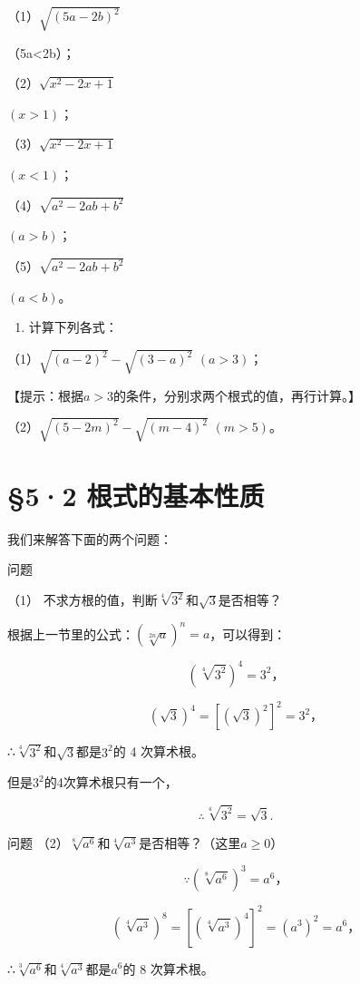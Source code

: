 （1）\(\sqrt{(5a - 2b)^2}\)

（5a\textless2b）；

（2）\(\sqrt{x^2 - 2x + 1}\)

\((x > 1)\)；

（3）\(\sqrt{x^2 - 2x + 1}\)

\((x < 1)\)；

（4）\(\sqrt{a^2 - 2ab + b^2}\)

\((a > b)\)；

（5）\(\sqrt{a^2 - 2ab + b^2}\)

\((a < b)\)。

\begin{enumerate}[start=8]
\item
  计算下列各式：
\end{enumerate}

（1）\(\sqrt{(a - 2)^2} - \sqrt{(3 - a)^2}\) \((a > 3)\)；

【提示：根据\(a > 3\)的条件，分别求两个根式的值，再行计算。】

（2）\(\sqrt{(5 - 2m)^2} - \sqrt{(m - 4)^2}\) \((m > 5)\)。

\section{§5·2 根式的基本性质}

我们来解答下面的两个问题：

问题

（1） 不求方根的值，判断\(\sqrt[4]{3^{2}}\)和\(\sqrt{3}\)是否相等？

根据上一节里的公式：\((\sqrt[2n]{a})^{n}=a\)，可以得到：

\[
(\sqrt[4]{3 ^ {2}}) ^ {4} = 3 ^ {2}\text{，}
\]

\[
(\sqrt {3}) ^ {4} = [ (\sqrt {3}) ^ {2} ] ^ {2} = 3 ^ {2}\text{，}
\]

∴\(\sqrt[4]{3^{2}}\)和\(\sqrt{3}\)都是\(3^{2}\)的 4 次算术根。

但是\(3^{2}\)的4次算术根只有一个，

\[
\therefore \sqrt[4]{3 ^ {2}} = \sqrt {3}.
\]

问题
（2）\(\sqrt[8]{a^6}\)和\(\sqrt[4]{a^3}\)是否相等？（这里\(a \geqslant 0\)）

\[
\because \left(\sqrt[8]{a ^ {6}}\right) ^ {3} = a ^ {6}\text{，}
\]

\[
(\sqrt[4]{a ^ {3}}) ^ {8} = [ (\sqrt[4]{a ^ {3}}) ^ {4} ] ^ {2} = (a ^ {3}) ^ {2} = a ^ {6}\text{，}
\]

∴\(\sqrt[3]{a^{6}}\)和\(\sqrt[4]{a^{3}}\)都是\(a^{6}\)的 8 次算术根。

